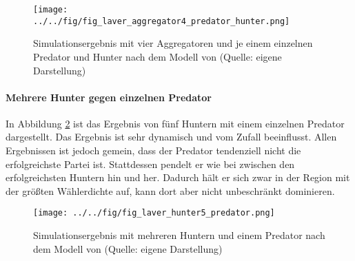 \begin{figure}[htb]
	\centering
	\texttt{[image: ../../fig/fig\_laver\_aggregator4\_predator\_hunter.png]}
	\caption{Simulationsergebnis mit vier Aggregatoren und je einem einzelnen Predator und Hunter nach dem Modell von \citet{laver2005policy} (Quelle: eigene Darstellung)}
	\label{fig:laver-aggregator4-hunter-predator}
\end{figure}

\paragraph{Mehrere Hunter gegen einzelnen Predator}

In Abbildung \ref{fig:laver-hunter5-predator} ist das Ergebnis von fünf Huntern mit einem einzelnen Predator dargestellt. Das Ergebnis ist sehr dynamisch und vom Zufall beeinflusst. Allen Ergebnissen ist jedoch gemein, dass der Predator tendenziell nicht die erfolgreichste Partei ist. Stattdessen pendelt er wie bei \citet{laver2005policy} zwischen den erfolgreichsten Huntern hin und her. Dadurch hält er sich zwar in der Region mit der größten Wählerdichte auf, kann dort aber nicht unbeschränkt dominieren.

\begin{figure}[htb]
	\centering
	\texttt{[image: ../../fig/fig\_laver\_hunter5\_predator.png]}
	\caption{Simulationsergebnis mit mehreren Huntern und einem Predator nach dem Modell von \citet{laver2005policy} (Quelle: eigene Darstellung)}
	\label{fig:laver-hunter5-predator}
\end{figure}
